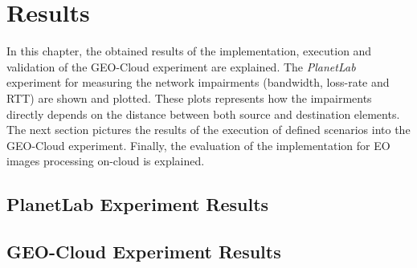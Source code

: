 \chapter{Results}
\label{chap:results}

In this chapter, the obtained results of the implementation, execution and
validation of the GEO-Cloud experiment are explained. The \emph{PlanetLab}
experiment for measuring the network impairments (bandwidth, loss-rate and
\ac{RTT}) are shown and plotted. These plots represents how the impairments
directly depends on the distance between both source and destination elements.
The next section pictures the results of the execution of defined scenarios into
the GEO-Cloud experiment. Finally, the evaluation of the implementation for
\ac{EO} images processing on-cloud is explained.

\section{PlanetLab Experiment Results}

\section{GEO-Cloud Experiment Results}
